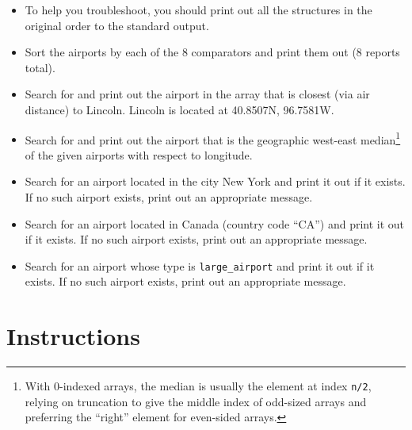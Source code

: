 \documentclass[12pt]{scrartcl}
\begin{document}
\begin{itemize}
  \item To help you troubleshoot, you should print out all the structures
  in the original order to the standard output.
  \item Sort the airports by each of the 8 comparators and print them 
  out (8 reports total).
  \item Search for and print out the airport in the array that is closest (via 
  air distance) to Lincoln.  Lincoln is located at 40.8507N, 96.7581W.
  \item Search for and print out the airport that is the geographic west-east
  median\footnote{With 0-indexed arrays, the median is usually the element at
  index \texttt{n/2}, relying on truncation to give the middle index of
  odd-sized arrays and preferring the ``right'' element for even-sided arrays.} 
  of the given airports with respect to longitude.  
  \item Search for an airport located in the city New York and print it out
  if it exists.  If no such airport exists, print out an appropriate message.
  \item Search for an airport located in Canada (country code ``CA'') and print it out
  if it exists.  If no such airport exists, print out an appropriate message.
  \item Search for an airport whose type is \texttt{large_airport} and
  print it out if it exists.  If no such airport exists, print out an appropriate message.
\end{itemize}

\section*{Instructions}
\end{document}
